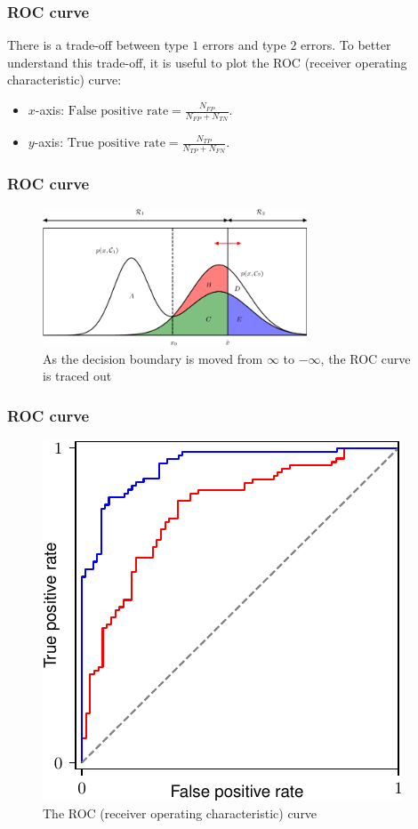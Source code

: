 \documentclass{beamer}
\begin{document}
\begin{frame}
    \frametitle{ROC curve}
    There is a trade-off between type $1$ errors and type $2$ errors. To better understand this trade-off, it is useful to plot the ROC (receiver operating characteristic) curve:
    \begin{itemize}
        \item $x$-axis: $\textrm{False positive rate}=\frac{N_{FP}}{N_{FP}+N_{TN}}$.
        \item $y$-axis: $\textrm{True positive rate}=\frac{N_{TP}}{N_{TP}+N_{FN}}$.
    \end{itemize}
\end{frame}

\begin{frame}
    \frametitle{ROC curve}
    \begin{figure}
        \caption{As the decision boundary is moved from $\infty$ to $-\infty$, the ROC curve is traced out}
        \includegraphics[width=0.7\textwidth]{Figure_10.pdf}
    \end{figure}
\end{frame}

\begin{frame}
    \frametitle{ROC curve}
    \begin{figure}
        \caption{The ROC (receiver operating characteristic) curve}
        \includegraphics[height=0.7\textheight]{Figure_11.pdf}
    \end{figure}
\end{frame}
\end{document}
